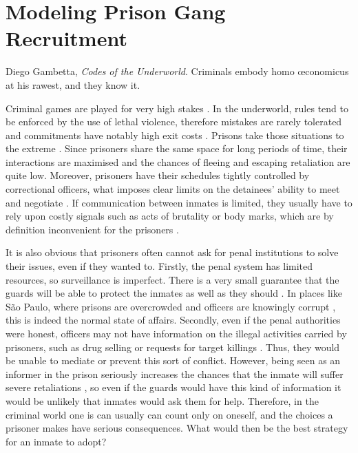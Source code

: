 \chapter{Modeling Prison Gang Recruitment}
\label{ch:chap4}


\begin{chapquote}{Diego Gambetta, \textit{Codes of the Underworld}.}
Criminals embody \textnormal{homo \oe conomicus} at his rawest, and they know it.
\end{chapquote}

Criminal games are played for very high stakes \citep[2]{dixit2011game}. In the underworld, rules tend to be enforced by the use of lethal violence, therefore mistakes are rarely tolerated and commitments have notably high exit costs \citep{campana2013cooperation}. Prisons take those situations to the extreme \citep{sykes1958society}. Since prisoners share the same space for long periods of time, their interactions are maximised and the chances of fleeing and escaping retaliation are quite low. Moreover, prisoners have their schedules tightly controlled by correctional officers, what imposes clear limits on the detainees' ability to meet and negotiate \citep[7]{skarbek2014social}. If communication between inmates is limited, they usually have to rely upon costly signals such as acts of brutality or body marks, which are by definition inconvenient for the prisoners \citep[]{gambetta2009codes}.

It is also obvious that prisoners often cannot ask for penal institutions to solve their issues, even if they wanted to. Firstly, the penal system has limited resources, so surveillance is imperfect. There is a very small guarantee that the guards will be able to protect the inmates as well as they should \citep[20]{skarbek2014social}. In places like S\~{a}o Paulo, where prisons are overcrowded and officers are knowingly corrupt \citep[]{darke2013inmate, lemgruber2005brazilian, silveira2007realidade}, this is indeed the normal state of affairs. Secondly, even if the penal authorities were honest, officers may not have information on the illegal activities carried by prisoners, such as drug selling or requests for target killings \citep[]{kauffman1988prison}. Thus, they would be unable to mediate or prevent this sort of conflict. However, being seen as an informer in the prison seriously increases the chances that the inmate will suffer severe retaliations \citep[]{aakerstrom1986outcasts}, so even if the guards would have this kind of information it would be unlikely that inmates would ask them for help. Therefore, in the criminal world one is can usually can count only on oneself, and the choices a prisoner makes have serious consequences. What would then be the best strategy for an inmate to adopt?

